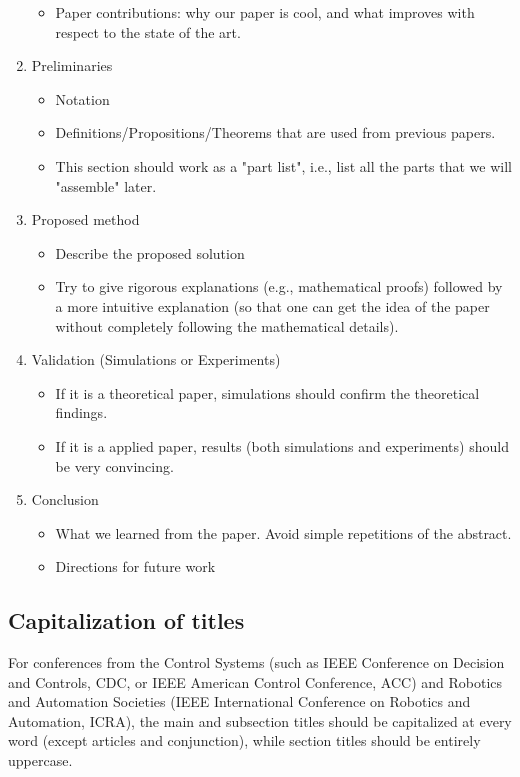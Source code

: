 \documentclass[letterpaper, 10 pt, conference]{ieeeconf}
\begin{document}
\begin{enumerate}
\begin{itemize}
  \item Paper contributions: why our paper is cool, and what improves with respect to the state of the art.
  \end{itemize}
\item Preliminaries
  \begin{itemize}
  \item Notation
  \item Definitions/Propositions/Theorems that are used from previous papers.
  \item This section should work as a "part list", i.e., list all the parts that we will "assemble" later.
  \end{itemize}
\item Proposed method
  \begin{itemize}
  \item Describe the proposed solution
  \item Try to give rigorous explanations (e.g., mathematical proofs) followed by a more intuitive explanation (so that one can get the idea of the paper without completely following the mathematical details).
  \end{itemize}
\item Validation (Simulations or Experiments)
  \begin{itemize}
  \item If it is a theoretical paper, simulations should confirm the theoretical findings.
  \item If it is a applied paper, results (both simulations and experiments) should be very convincing.
  \end{itemize}
\item Conclusion
  \begin{itemize}
  \item What we learned from the paper. Avoid simple repetitions of the abstract.
  \item Directions for future work
  \end{itemize}
\end{enumerate}

\subsection{Capitalization of titles}
For conferences from the Control Systems (such as IEEE Conference on Decision and Controls, CDC, or IEEE American Control Conference, ACC) and Robotics and Automation Societies (IEEE International Conference on Robotics and Automation, ICRA), the main and subsection titles should be capitalized at every word (except articles and conjunction), while section titles should be entirely uppercase.
\end{document}

